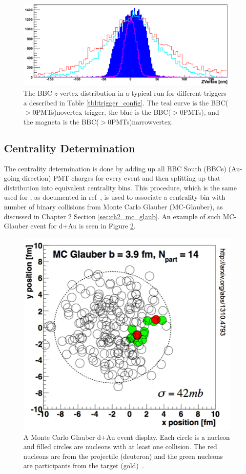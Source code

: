 \begin{figure}[h!]
\begin{center}
\includegraphics[width=0.65\linewidth]{figs/bbc_z_vertex_dist.png}
\caption{The BBC $z$-vertex distribution in a typical \pau run for different triggers a described in Table \ref{tbl:trigger_config}.  The teal curve is the BBC($>$0\thinspace PMTs)\thinspace novertex trigger, the blue is the BBC($>$0\thinspace PMTs), and the magneta is the BBC($>$0\thinspace PMTs)\thinspace narrowvertex.}
\label{fig:bbc_z_vtx_dist}
\end{center}
\end{figure}

\subsection{Centrality Determination}
\label{sec:central_determin}
The centrality determination is done by adding up all BBC South (BBCs) (Au-going direction) PMT charges for every event and then splitting up that distribution into equivalent centrality bins. This procedure, which is the same used for \dau, as documented in ref~\cite{PhysRevC.90.034902}, is used to associate a centrality bin with number of binary collisions from Monte Carlo Glauber (MC-Glauber), as discussed in Chapter 2 Section \ref{sec:ch2_mc_glaub}. An example of such MC-Glauber event for d+Au is seen in Figure \ref{fig:glauber_event_display}.  
\label{centrality_determination}
\begin{figure}[!ht]
\begin{center}
\includegraphics[width=0.5\linewidth]{figs/glauber_event_display.png}
\caption{A Monte Carlo Glauber d+Au event display. Each circle is a nucleon and filled circles are nucleons with at least one collision. The red nucleons are from the projectile (deuteron) and the green nucleons are participants from the target (gold)~\cite{PhysRevC.90.034902}.}
\label{fig:glauber_event_display}
\end{center}
\end{figure}

